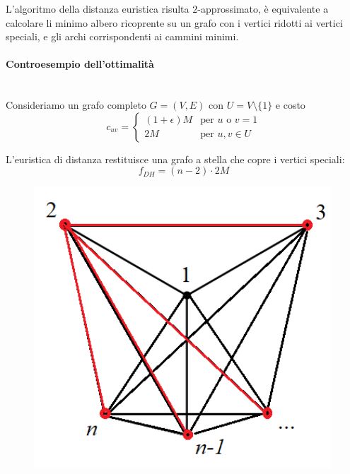 \documentclass{article}
\begin{document}
    L'algoritmo della distanza euristica risulta $2$-approssimato, è equivalente a calcolare li minimo albero ricoprente
    su un grafo con i vertici ridotti ai vertici speciali, e gli archi corrispondenti ai cammini minimi.
    \paragraph{Controesempio dell'ottimalità}\mbox{}\\
    Consideriamo un grafo completo $G=(V,E)$ con $U = V\setminus \{1\}$ e costo
    \[
        c_{uv}=
        \begin{cases}
            (1+\epsilon)M & \text{per } u \text{ o } v=1 \\
            2M            & \text{per }u,v\in U
        \end{cases}
    \]

    L'euristica di distanza restituisce una grafo a stella che copre i vertici speciali:
    $$f_{DH} = (n-2)\cdot 2M$$
    \begin{figure}[H]
        \centering
        \includegraphics[scale=0.5]{images/star0.png}
    \end{figure}
\end{document}
